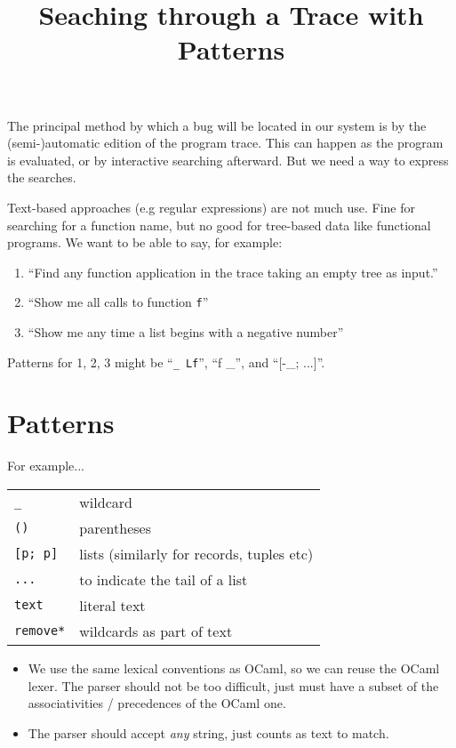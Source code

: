 \documentclass[10pt]{article}
\begin{document}
\title{Seaching through a Trace with Patterns}
\maketitle

The principal method by which a bug will be located in our system is by the (semi-)automatic edition of the program trace. This can happen as the program is evaluated, or by interactive searching afterward. But we need a way to express the searches.

Text-based approaches (e.g regular expressions) are not much use. Fine for searching for a function name, but no good for tree-based data like functional programs. We want to be able to say, for example:

\begin{enumerate}
\item ``Find any function application in the trace taking an empty tree as input.''
\item ``Show me all calls to function \texttt{f}''
\item ``Show me any time a list begins with a negative number''
\end{enumerate}

\noindent Patterns for 1, 2, 3 might be ``\texttt{\_ Lf}'', ``f \_'', and ``[-\_; ...]''.

\section{Patterns}

For example...

\begin{tabular}{ll}
\texttt{\_} & wildcard\\
\texttt{()} & parentheses\\
\texttt{{[}p; p{]}} & lists (similarly for records, tuples etc)\\
\texttt{...} & to indicate the tail of a list\\
\texttt{text} & literal text\\
\texttt{remove*} & wildcards as part of text\\
\end{tabular}

\begin{itemize}
\item We use the same lexical conventions as OCaml, so we can reuse the OCaml lexer. The parser should not be too difficult, just must have a subset of the associativities / precedences of the OCaml one.
\item The parser should accept \textit{any} string, just counts as text to match.
\end{itemize}
\end{document}
